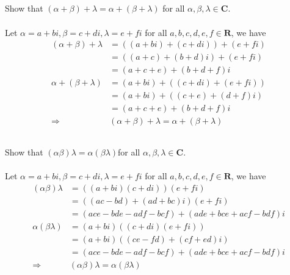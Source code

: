 \documentclass[a4paper]{article}
\begin{document}
\subsection{}
Show that $(\alpha + \beta) + \lambda = \alpha + (\beta + \lambda)$ for all $\alpha, \beta, \lambda \in \bm{C}$.
\paragraph{}
Let $\alpha = a + bi, \beta = c + di, \lambda = e + fi$ for all $a,b,c,d,e,f \in \bm{R}$, we have
$$
    \begin{aligned}
        (\alpha + \beta) + \lambda & = ((a + bi) + (c + di)) + (e + fi)                      \\
                                   & = ((a + c) + (b + d)i) + (e + fi)                       \\
                                   & = (a + c + e) + (b + d + f)i                            \\
        \alpha + (\beta + \lambda) & = (a + bi) + ((c + di) +(e + fi))                       \\
                                   & = (a + bi) + ((c + e) + (d + f)i)                       \\
                                   & = (a + c + e) + (b + d + f)i                            \\
        \Rightarrow        \quad   & (\alpha + \beta) + \lambda = \alpha + (\beta + \lambda)
    \end{aligned}
$$

\subsection{}
Show that $(\alpha\beta)\lambda=\alpha(\beta\lambda)$for all $\alpha,\beta,\lambda\in\bm{C}$.
\paragraph{}
Let $\alpha = a + bi, \beta = c + di, \lambda = e + fi$ for all $a,b,c,d,e,f \in \bm{R}$, we have
$$
    \begin{aligned}
        (\alpha\beta)\lambda     & = ((a + bi)(c + di))(e + fi)                         \\
                                 & = ((ac - bd) + (ad + bc)i)(e + fi)                   \\
                                 & = (ace - bde - adf - bcf) + (ade + bce + acf - bdf)i \\
        \alpha(\beta\lambda)     & = (a + bi)((c + di)(e + fi))                         \\
                                 & = (a + bi)((ce - fd) + (cf + ed)i)                   \\
                                 & = (ace - bde - adf - bcf) + (ade + bce + acf - bdf)i \\
        \Rightarrow        \quad & (\alpha\beta)\lambda = \alpha(\beta\lambda)
    \end{aligned}
$$
\end{document}
